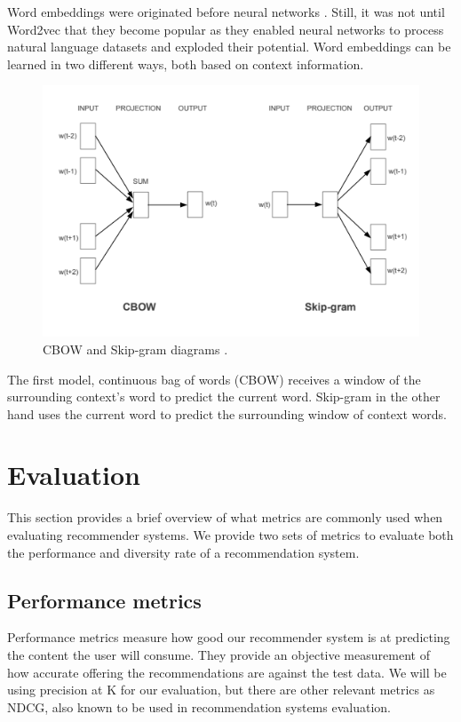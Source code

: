 \documentclass{kththesis}
\begin{document}
Word embeddings were originated before neural networks \cite{embeddingsPre1, embeddingsPre2, embeddingsPre3}. Still, it was not until Word2vec \cite{word2vec} that they become popular as they enabled neural networks to process natural language datasets and exploded their potential. Word embeddings can be learned in two different ways, both based on context information.

\begin{figure}[H]
    \centering
    \includegraphics[scale=0.6]{images/background/word2vec.PNG}
    \caption{CBOW and Skip-gram diagrams \cite{word2vec}.}
\end{figure}

The first model, continuous bag of words (CBOW) receives a window of the surrounding context's word to predict the current word. Skip-gram in the other hand uses the current word to predict the surrounding window of context words.


\section{Evaluation}
This section provides a brief overview of what metrics are commonly used when evaluating recommender systems. We provide two sets of metrics to evaluate both the performance and diversity rate of a recommendation system.
\subsection{Performance metrics}
Performance metrics measure how good our recommender system is at predicting the content the user will consume. They provide an objective measurement of how accurate offering the recommendations are against the test data. We will be using precision at K for our evaluation, but there are other relevant metrics as NDCG, also known to be used in recommendation systems evaluation.
\end{document}
